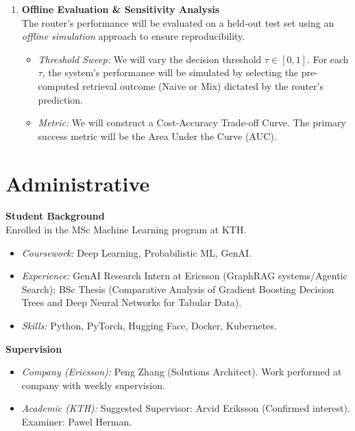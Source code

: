 \documentclass[11pt, a4paper]{article}
\begin{document}
\begin{enumerate}[leftmargin=*, label=\textbf{\arabic*.}]
    \item \textbf{Offline Evaluation \& Sensitivity Analysis} \\
    The router's performance will be evaluated on a held-out test set using an \emph{offline simulation} approach to ensure reproducibility.
    \begin{itemize}[label=--]
        \item \emph{Threshold Sweep:} We will vary the decision threshold $\tau \in [0, 1]$. For each $\tau$, the system's performance will be simulated by selecting the pre-computed retrieval outcome (Naive or Mix) dictated by the router's prediction.
        \item \emph{Metric:} We will construct a Cost-Accuracy Trade-off Curve. The primary success metric will be the Area Under the Curve (AUC).
    \end{itemize}
\end{enumerate}


\section{Administrative}

\textbf{Student Background} \\
Enrolled in the MSc Machine Learning program at KTH.
\begin{itemize}[label=--]
    \item \emph{Coursework:} Deep Learning, Probabilistic ML, GenAI.
    \item \emph{Experience:} GenAI Research Intern at Ericsson (GraphRAG systems/Agentic Search); BSc Thesis (Comparative Analysis of Gradient Boosting Decision Trees and Deep Neural Networks for Tabular Data).
    \item \emph{Skills:} Python, PyTorch, Hugging Face, Docker, Kubernetes.
\end{itemize}

\textbf{Supervision}
\begin{itemize}[label=--]
    \item \emph{Company (Ericsson):} Peng Zhang (Solutions Architect). Work performed at company with weekly supervision.
    \item \emph{Academic (KTH):} Suggested Supervisor: Arvid Eriksson (Confirmed interest). Examiner: Pawel Herman.
\end{itemize}
\end{document}
